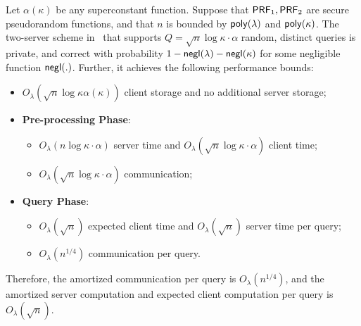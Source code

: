 \begin{theorem}
    \label{thm:eff2srv} %
    Let $\alpha(\kappa)$ be any superconstant function. 
Suppose that $\mathsf{PRF}_1,\mathsf{PRF}_2$ are secure pseudorandom functions, and that 
$n$ is bounded by $\mathsf{poly}(\lambda)$ and
    $\mathsf{poly}(\kappa)$. The two-server scheme in~ 
that supports
    $Q = \sqrt{n}\log \kappa \cdot \alpha$ 
random, distinct
queries is private, and correct with probability
    $1-\mathsf{negl}(\lambda)-\mathsf{negl}(\kappa)$ for some negligible function 
$\mathsf{negl}(.)$. Further, it achieves the following performance
    bounds:
    \begin{itemize}
        \item $O_\lambda(\sqrt{n}\log \kappa \alpha(\kappa))$ client storage and
        no additional server storage;
        \item \textbf{Pre-processing Phase}:
        \begin{itemize}
            \item $O_\lambda(n \log \kappa \cdot \alpha)$ 
server time and $O_\lambda(\sqrt{n}\log \kappa \cdot \alpha)$ client time;
            \item $O_\lambda(\sqrt{n} \log \kappa \cdot \alpha)$ communication;
        \end{itemize}
        \item \textbf{Query Phase}:
        \begin{itemize}
            \item 
$O_\lambda(\sqrt{n})$ expected client time 
and $O_\lambda(\sqrt{n})$ server
            time per query; 
            \item $O_\lambda(n^{1/4})$
            communication per query.
        \end{itemize}
    \end{itemize} 
Therefore, the amortized communication per query
is %
$O_\lambda(n^{1/4})$, and the amortized server computation
and expected client computation
per query is %
$O_\lambda(\sqrt{n})$.
\end{theorem}
